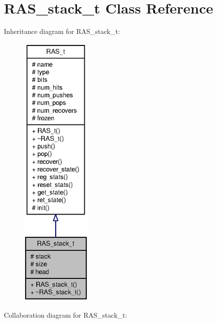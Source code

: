 \section{RAS\_\-stack\_\-t Class Reference}
\label{classRAS__stack__t}
Inheritance diagram for RAS\_\-stack\_\-t:\nopagebreak
\begin{figure}[H]
\begin{center}
\leavevmode
\includegraphics[height=400pt]{classRAS__stack__t__inherit__graph}
\end{center}
\end{figure}
Collaboration diagram for RAS\_\-stack\_\-t:\nopagebreak
